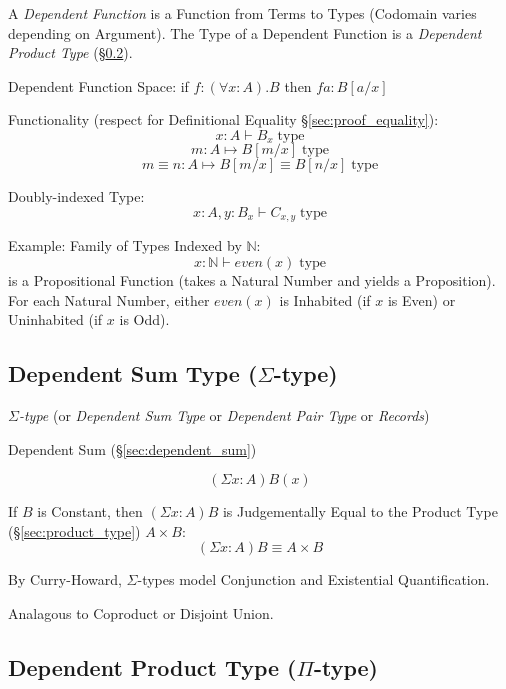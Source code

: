 A \emph{Dependent Function} is a Function from Terms to Types
(Codomain varies depending on Argument). The Type of a Dependent
Function is a \emph{Dependent Product Type}
(\S\ref{sec:pi_type}).

Dependent Function Space: if $f:(\forall x: A).B$ then $f a : B[a/x]$

Functionality (respect for Definitional Equality
\S\ref{sec:proof_equality}):
\[
  x : A \vdash B_x \;\text{type}
\]\[
  m : A \mapsto B[m/x] \;\text{type}
\]\[
  m \equiv n : A \mapsto B[m/x] \equiv B[n/x] \;\text{type}
\]

Doubly-indexed Type:
\[
  x : A, y : B_x \vdash C_{x,y} \;\text{type}
\]

Example: Family of Types Indexed by $\mathbb{N}$:
\[
  x : \mathbb{N} \vdash even(x) \;\text{type}
\]
is a Propositional Function (takes a Natural Number and yields a
Proposition). For each Natural Number, either $even(x)$ is Inhabited
(if $x$ is Even) or Uninhabited (if $x$ is Odd).\cite{harper12}



\subsection{Dependent Sum Type ($\Sigma$-type)}\label{sec:sigma_type}

\emph{$\Sigma$-type} (or \emph{Dependent Sum Type} or \emph{Dependent
  Pair Type} or \emph{Records})

Dependent Sum (\S\ref{sec:dependent_sum})

\[
  (\Sigma x:A) B(x)
\]

If $B$ is Constant, then $(\Sigma x:A)B$ is Judgementally Equal to
the Product Type (\S\ref{sec:product_type}) $A \times B$:
\[
  (\Sigma x:A) B \equiv A \times B
\]

By Curry-Howard, $\Sigma$-types model Conjunction and Existential
Quantification.

Analagous to Coproduct or Disjoint Union.



\subsection{Dependent Product Type ($\Pi$-type)}\label{sec:pi_type}


